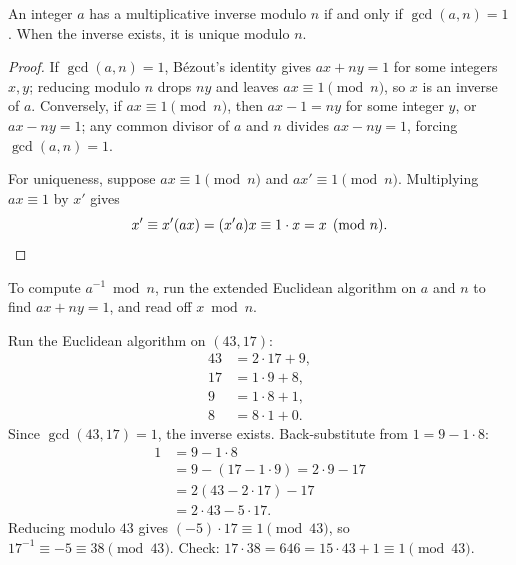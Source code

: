 \begin{theorem}
\label{ch04:thm-inverse}
An integer $a$ has a multiplicative inverse modulo $n$ if and only if $\gcd(a, n) = 1$. When the
inverse exists, it is unique modulo $n$.
\end{theorem}

\begin{proof}
If $\gcd(a, n) = 1$, B\'ezout's identity gives $ax + ny = 1$ for some integers $x, y$; reducing
modulo $n$ drops $ny$ and leaves $ax \equiv 1 \pmod n$, so $x$ is an inverse of $a$. Conversely, if
$ax \equiv 1 \pmod n$, then $ax - 1 = ny$ for some integer $y$, or $ax - ny = 1$; any common divisor
of $a$ and $n$ divides $ax - ny = 1$, forcing $\gcd(a, n) = 1$.

For uniqueness, suppose $ax \equiv 1 \pmod n$ and $ax' \equiv 1 \pmod n$. Multiplying $ax \equiv 1$
by $x'$ gives
\[
  x' \equiv x'(ax) = (x'a)x \equiv 1 \cdot x = x \pmod n. \qedhere
\]
\end{proof}

To compute $a^{-1} \bmod n$, run the extended Euclidean algorithm on $a$ and $n$ to find
$ax + ny = 1$, and read off $x \bmod n$.

\begin{example}
\label{ch04:ex-inverse}
Run the Euclidean algorithm on $(43, 17)$:
\begin{align*}
43 &= 2 \cdot 17 + 9, \\
17 &= 1 \cdot 9 + 8, \\
 9 &= 1 \cdot 8 + 1, \\
 8 &= 8 \cdot 1 + 0.
\end{align*}
Since $\gcd(43, 17) = 1$, the inverse exists. Back-substitute from $1 = 9 - 1 \cdot 8$:
\begin{align*}
1 &= 9 - 1 \cdot 8 \\
  &= 9 - (17 - 1 \cdot 9) = 2 \cdot 9 - 17 \\
  &= 2(43 - 2 \cdot 17) - 17 \\
  &= 2 \cdot 43 - 5 \cdot 17.
\end{align*}
Reducing modulo $43$ gives $(-5) \cdot 17 \equiv 1 \pmod{43}$, so
$17^{-1} \equiv -5 \equiv 38 \pmod{43}$. Check: $17 \cdot 38 = 646 = 15 \cdot 43 + 1 \equiv 1
\pmod{43}$.
\end{example}

